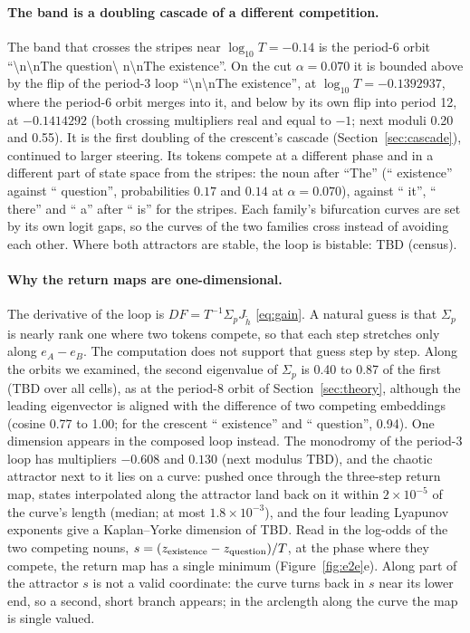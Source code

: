 \paragraph{The band is a doubling cascade of a different competition.} The band that crosses the stripes near
$\log_{10}T=-0.14$ is the period-6 orbit ``\textbackslash n\textbackslash nThe question\textbackslash
n\textbackslash nThe existence''. On the cut $\alpha=0.070$ it is bounded above by the flip of the period-3 loop
``\textbackslash n\textbackslash nThe existence'', at $\log_{10}T=-0.1392937$, where the period-6 orbit merges into
it, and below by its own flip into period 12, at $-0.1414292$ (both crossing multipliers real and equal to $-1$; next
moduli 0.20 and 0.55). It is the first doubling of the crescent's cascade (Section~\ref{sec:cascade}), continued to
larger steering. Its tokens compete at a different phase and in a different part of state space from the stripes:
the noun after ``The'' (`` existence'' against `` question'', probabilities $0.17$ and $0.14$ at $\alpha=0.070$),
against `` it'', `` there'' and `` a'' after `` is'' for the stripes. Each family's bifurcation curves are set by its
own logit gaps, so the curves of the two families cross instead of avoiding each other. Where both attractors are
stable, the loop is bistable: TBD (census).

\paragraph{Why the return maps are one-dimensional.} The derivative of the loop is
$DF=T^{-1}\Sigma_pJ_{\tilde h}$ \eqref{eq:gain}. A natural guess is that $\Sigma_p$ is nearly rank one where two tokens
compete, so that each step stretches only along $e_A-e_B$. The computation does not support that guess step by
step. Along the orbits we examined, the second eigenvalue of $\Sigma_p$ is 0.40 to 0.87 of the first (TBD over all
cells), as at the period-8 orbit of Section~\ref{sec:theory}, although the leading eigenvector is aligned with the
difference of two competing embeddings (cosine 0.77 to 1.00; for the crescent `` existence'' and `` question'',
0.94). One dimension appears in the composed loop instead. The monodromy of the period-3 loop has multipliers
$-0.608$ and $0.130$ (next modulus TBD), and the chaotic attractor next to it lies on a curve: pushed once through
the three-step return map, states interpolated along the attractor land back on it within $2\times10^{-5}$ of the
curve's length (median; at most $1.8\times10^{-3}$), and the four leading Lyapunov exponents give a Kaplan--Yorke
dimension of TBD. Read in the log-odds of the two competing nouns, $s=(z_{\rm existence}-z_{\rm question})/T$, at
the phase where they compete, the return map has a single minimum (Figure~\ref{fig:e2e}e). Along part of the
attractor $s$ is not a valid coordinate: the curve turns back in $s$ near its lower end, so a second, short branch
appears; in the arclength along the curve the map is single valued.

